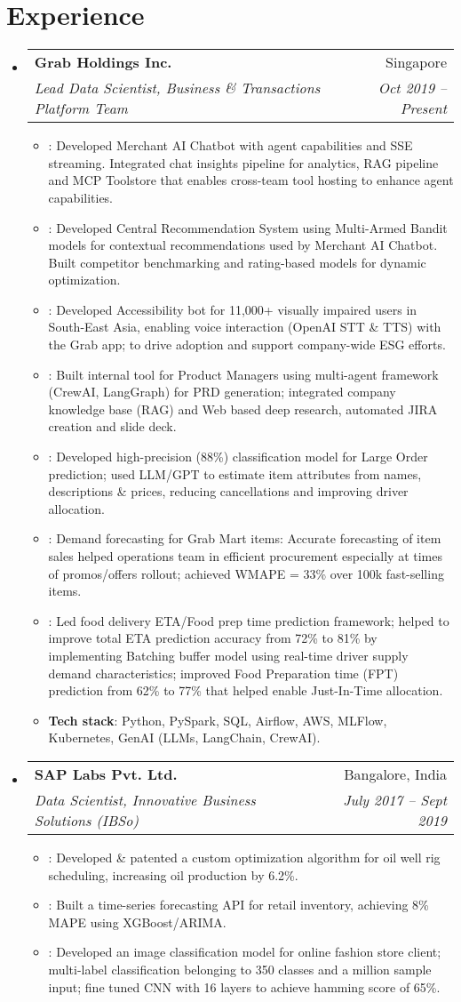 \documentclass[letterpaper,11pt]{article}
\makeatletter
\newcommand{\resumeItem}[2]{
  \item\small{
    \textbf{#1}{: #2 \vspace{-2pt}}
  }
}
\newcommand{\resumeSubheading}[4]{
  \vspace{-1pt}\item
    \begin{tabular*}{0.97\textwidth}[t]{l@{\extracolsep{\fill}}r}
      \textbf{#1} & #2 \\
      \textit{\small#3} & \textit{\small #4} \\
    \end{tabular*}\vspace{-5pt}
}
\newcommand{\resumeSubHeadingListStart}{\begin{itemize}[leftmargin=*]}
\newcommand{\resumeSubHeadingListEnd}{\end{itemize}}
\newcommand{\resumeItemListStart}{\begin{itemize}}
\newcommand{\resumeItemListEnd}{\end{itemize}\vspace{-5pt}}
\makeatother
\begin{document}
\section{Experience}
  \resumeSubHeadingListStart
    \resumeSubheading
      {Grab Holdings Inc.}{Singapore}
      {Lead Data Scientist, Business \& Transactions Platform Team}{Oct 2019 -- Present}
      \resumeItemListStart
        \resumeItem{}
          {Developed Merchant AI Chatbot with agent capabilities and SSE streaming. Integrated chat insights pipeline for analytics, RAG pipeline and MCP Toolstore that enables cross-team tool hosting to enhance agent capabilities.}
        \resumeItem{}
          {Developed Central Recommendation System using Multi-Armed Bandit models for contextual recommendations used by Merchant AI Chatbot. Built competitor benchmarking and rating-based models for dynamic optimization.}
        \resumeItem{}
          {Developed Accessibility bot for 11,000+ visually impaired users in South-East Asia, enabling voice interaction (OpenAI STT \& TTS) with the Grab app; to drive adoption and support company-wide ESG efforts.}
        \resumeItem{}
          {Built internal tool for Product Managers using multi-agent framework (CrewAI, LangGraph) for PRD generation; integrated company knowledge base (RAG) and Web based deep research, automated JIRA creation and slide deck.}
        \resumeItem{}
          {Developed high-precision (88\%) classification model for Large Order prediction; used LLM/GPT to estimate item attributes from names, descriptions \& prices, reducing cancellations and improving driver allocation.}
        \resumeItem{}
          {Demand forecasting for Grab Mart items: Accurate forecasting of item sales helped operations team in efficient procurement especially at times of promos/offers rollout; achieved WMAPE = 33\% over 100k fast-selling items.}
        \resumeItem{}
          {Led food delivery ETA/Food prep time prediction framework; helped to improve total ETA prediction accuracy from 72\% to 81\% by implementing Batching buffer model using real-time driver supply demand characteristics; improved Food Preparation time (FPT) prediction from 62\% to 77\% that helped enable Just-In-Time allocation.}
        \resumeItem{Tech stack}
          {Python, PySpark, SQL, Airflow, AWS, MLFlow, Kubernetes, GenAI (LLMs, LangChain, CrewAI).}
      \resumeItemListEnd
    \resumeSubheading
      {SAP Labs Pvt. Ltd.}{Bangalore, India}
      {Data Scientist, Innovative Business Solutions (IBSo)}{July 2017 -- Sept 2019}
      \resumeItemListStart
        \resumeItem{}
          {Developed \& patented a custom optimization algorithm for oil well rig scheduling, increasing oil production by 6.2\%.}
        \resumeItem{}
          {Built a time-series forecasting API for retail inventory, achieving 8\% MAPE using XGBoost/ARIMA.}
        \resumeItem{}
          {Developed an image classification model for online fashion store client; multi-label classification belonging to 350 classes and a million sample input; fine tuned CNN with 16 layers to achieve hamming score of 65\%.}
      \resumeItemListEnd
  \resumeSubHeadingListEnd
\end{document}
